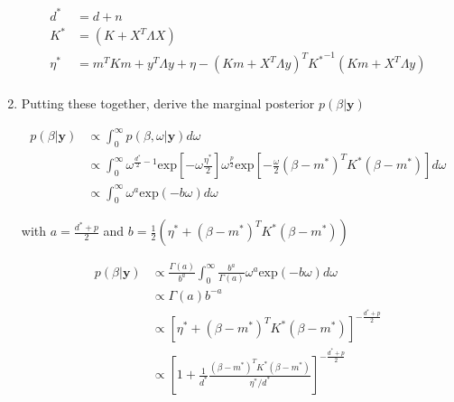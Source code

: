 \documentclass[10pt]{article}
\newcommand{\by}{\mathbf{y}}
\begin{document}
\begin{enumerate}[label=(\Alph*)]
      \begin{align*}
        d^* &= d+n \\
        K^* &= ( K+ X^T \Lambda X) \\
        \eta^* &= m^T K m + y^T \Lambda y + \eta - (K m + X^T \Lambda y)^T  {K^*}^{-1} (K m + X^T \Lambda y) \\
      \end{align*}

      \item Putting these together, derive the marginal posterior $p(\beta | \by) $

      \begin{align*}
        p(\beta | \by) &\propto \int_0^{\infty} p(\beta, \omega | \by) d \omega \\
        & \propto \int_0^{\infty} \omega^{\frac{d^*}{2} - 1} \text{exp}\left[-\omega \frac{\eta^*}{2} \right]\omega^{\frac{p}{2}} \text{exp} \left[ -\frac{\omega}{2} (\beta - m^*)^T K^* (\beta - m^*) \right] d\omega \\
        & \propto \int_0^{\infty} \omega^a \text{exp}(-b \omega) d \omega
      \end{align*}

      with $a = \frac{d^* + p}{2}$ and $b = \frac{1}{2}\left( \eta^* + (\beta - m^*)^T K^* (\beta - m^*) \right)$

      \begin{align*}
        p(\beta | \by) &\propto \frac{\Gamma(a)}{b^a} \int_0^{\infty} \frac{b^a}{\Gamma(a)} \omega^a \text{exp}(-b \omega) d \omega \\
        & \propto \Gamma(a)b^{-a} \\
        & \propto \left [ \eta^* + (\beta - m^*)^T K^* (\beta - m^*) \right]^{-\frac{d^*+p}{2}} \\
        & \propto \left[ 1 + \frac{1}{d^*} \frac{(\beta - m^*)^T K^* (\beta - m^*)}{\eta^*/d^*}\right]^{-\frac{d^*+p}{2}}
      \end{align*}
      



    \end{enumerate}
\end{document}
